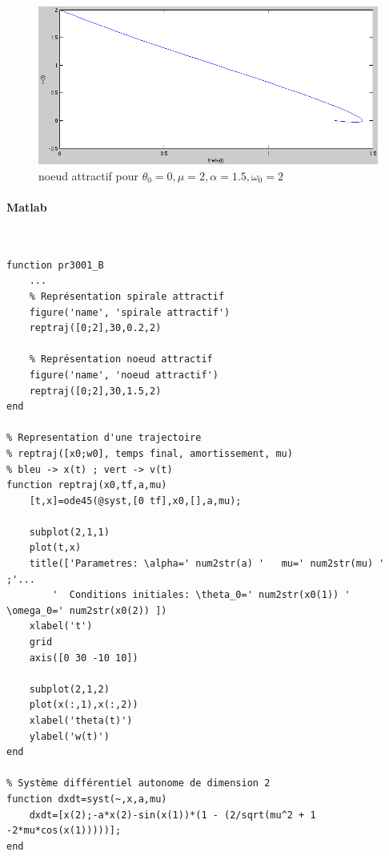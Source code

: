 \documentclass[11pt]{article}
\begin{document}
\begin{figure}[h!]
	\centering
	\includegraphics[scale=0.59]{Figures/rapport_traj_noeud.png}
	\caption{noeud attractif pour $\theta_0=0, \mu=2, \alpha=1.5,\omega_0=2$}
\end{figure}
\newpage

\paragraph{Matlab}\mbox{}\\
\begin{lstlisting}
function pr3001_B
	...
    % Représentation spirale attractif
    figure('name', 'spirale attractif')
    reptraj([0;2],30,0.2,2)

    % Représentation noeud attractif
    figure('name', 'noeud attractif')
    reptraj([0;2],30,1.5,2)
end

% Representation d'une trajectoire
% reptraj([x0;w0], temps final, amortissement, mu)
% bleu -> x(t) ; vert -> v(t)
function reptraj(x0,tf,a,mu)
    [t,x]=ode45(@syst,[0 tf],x0,[],a,mu);

    subplot(2,1,1)
    plot(t,x)
    title(['Parametres: \alpha=' num2str(a) '   mu=' num2str(mu) '  ;'...
        '  Conditions initiales: \theta_0=' num2str(x0(1)) '  \omega_0=' num2str(x0(2)) ])
    xlabel('t')
    grid
    axis([0 30 -10 10])

    subplot(2,1,2)
    plot(x(:,1),x(:,2))
    xlabel('theta(t)')
    ylabel('w(t)')
end

% Système différentiel autonome de dimension 2
function dxdt=syst(~,x,a,mu)
	dxdt=[x(2);-a*x(2)-sin(x(1))*(1 - (2/sqrt(mu^2 + 1 -2*mu*cos(x(1)))))];
end
\end{lstlisting}

\newpage

\appendix
\end{document}
